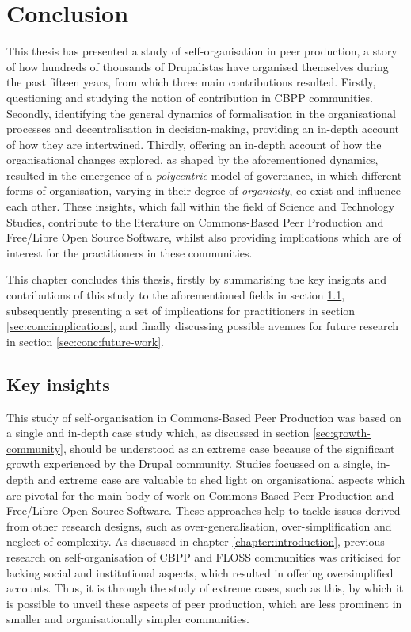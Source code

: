 \chapter{Conclusion}
\label{conclusion:chapter}

This thesis has presented a study of self-organisation in peer production, a story of how hundreds of thousands of Drupalistas have organised themselves during the past fifteen years, from which three main contributions resulted. Firstly, questioning and studying the notion of contribution in CBPP communities. Secondly, identifying the general dynamics of formalisation in the organisational processes and decentralisation in decision-making, providing an in-depth account of how they are intertwined. Thirdly, offering an in-depth account of how the organisational changes explored, as shaped by the aforementioned dynamics, resulted in the emergence of a \textit{polycentric} model of governance, in which different forms of organisation, varying in their degree of \textit{organicity}, co-exist and influence each other. These insights, which fall within the field of Science and Technology Studies, contribute to the literature on Commons-Based Peer Production and Free/Libre Open Source Software, whilst also providing implications which are of interest for the practitioners in these communities.

This chapter concludes this thesis, firstly by summarising the key insights and contributions of this study to the aforementioned fields in section \ref{sec:conc:findings}, subsequently presenting a set of implications for practitioners in section \ref{sec:conc:implications}, and finally discussing possible avenues for future research in section \ref{sec:conc:future-work}.

\section{Key insights}
\label{sec:conc:findings}

This study of self-organisation in Commons-Based Peer Production was based on a single and in-depth case study which, as discussed in section \ref{sec:growth-community}, should be understood as an extreme case because of the significant growth experienced by the Drupal community. Studies focussed on a single, in-depth and extreme case are valuable to shed light on organisational aspects which are pivotal for the main body of work on Commons-Based Peer Production and Free/Libre Open Source Software. These approaches help to tackle issues derived from other research designs, such as over-generalisation, over-simplification and neglect of complexity. As discussed in chapter \ref{chapter:introduction}, previous research on self-organisation of CBPP and FLOSS communities was criticised \parencite{viegas2007hidden, mateos2008institutions} for lacking social and institutional aspects, which resulted in offering oversimplified accounts. Thus, it is through the study of extreme cases, such as this, by which it is possible to unveil these aspects of peer production, which are less prominent in smaller and organisationally simpler communities. 

